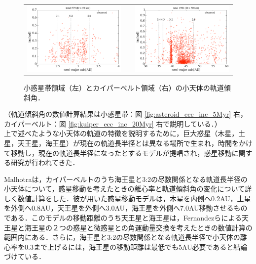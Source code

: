 \documentclass[11pt,a4paper,oneside,onecolumn]{jreport}
\begin{document}
\begin{figure}[H]
\begin{tabular}{ccc}
\begin{minipage}[t]{0.45\hsize}
\centering
\includegraphics[width=8cm]{./image/mainbelt_inc.pdf}
\end{minipage} &
\begin{minipage}[t]{0.1\hsize}
\end{minipage} &
\begin{minipage}[t]{0.45\hsize}
\centering
\includegraphics[width=8cm]{./image/kuiperbelt_inc.pdf}
\end{minipage}\\
%
\end{tabular}
\caption{小惑星帯領域（左）とカイパーベルト領域（右）の小天体の軌道傾斜角．\label{fig:obs_inc}}
\end{figure}

（軌道傾斜角の数値計算結果は小惑星帯：図 \ref{fig:asteroid_ecc_inc_5Myr} 右，カイパーベルト：図 \ref{fig:kuiper_ecc_inc_20Myr} 右で説明している．）
\\

上で述べたような小天体の軌道の特徴を説明するために，巨大惑星（木星，土星，天王星，海王星）が現在の軌道長半径とは異なる場所で生まれ，時間をかけて移動し，現在の軌道長半径になったとするモデルが提唱され，惑星移動に関する研究が行われてきた．

Malhotraは，カイパーベルトのうち海王星と3:2の尽数関係となる軌道長半径の小天体について，惑星移動を考えたときの離心率と軌道傾斜角の変化について詳しく数値計算をした\cite{Malhotra}．彼が用いた惑星移動モデルは，木星を内側へ0.2AU，土星を外側へ0.8AU，天王星を外側へ3.0AU，海王星を外側へ7.0AU移動させるものである．このモデルの移動距離のうち天王星と海王星は，Fernandezらによる天王星と海王星の２つの惑星と微惑星との角運動量交換を考えたときの数値計算\cite{Fernandez}の範囲内にある．さらに，海王星と3:2の尽数関係となる軌道長半径で小天体の離心率を0.3まで上げるには，海王星の移動距離は最低でも5AU必要であると結論づけている．
\end{document}
